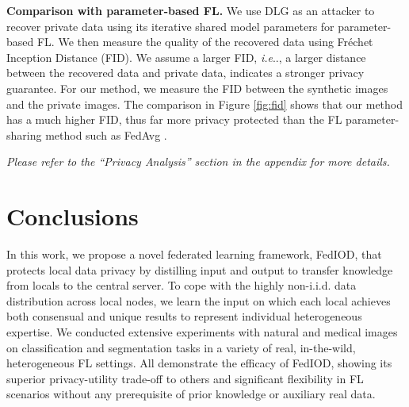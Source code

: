 \documentclass[letterpaper]{article} %
\makeatletter
\DeclareRobustCommand\onedot{\futurelet\@let@token\@onedot}
\def\@onedot{\ifx\@let@token.\else.\null\fi\xspace}
\def\ie{\emph{i.e}\onedot} \def\Ie{\emph{I.e}\onedot}
\makeatother
\begin{document}
 \textbf{Comparison with parameter-based FL.}
We use DLG \cite{zhu2019deep} as an attacker to recover private data using its iterative shared model parameters for parameter-based FL. We then measure the quality of the recovered data using Fréchet Inception Distance (FID).
We assume a larger FID, \ie, a larger distance between the recovered data and private data, indicates a stronger privacy guarantee. For our method, we measure the FID between the synthetic images and the private images. The comparison in Figure \ref{fig:fid} shows that our method has a much higher FID, thus far more privacy protected than the FL parameter-sharing method such as FedAvg \cite{mcmahan2017communication}.

\textit{Please refer to the ``Privacy Analysis'' section in the appendix for more details.}

\section{Conclusions}
In this work, we propose a novel federated learning framework, FedIOD, that protects local data privacy by distilling input and output to transfer knowledge from locals to the central server. To cope with the highly non-i.i.d. data distribution across local nodes, we learn the input on which each local achieves both consensual and unique results to represent individual heterogeneous expertise.
We conducted extensive experiments with natural and medical images on classification and segmentation tasks in a variety of real, in-the-wild, heterogeneous FL settings.
All demonstrate the efficacy of FedIOD, showing its superior privacy-utility trade-off to others and significant flexibility in FL scenarios without any prerequisite of prior knowledge or auxiliary real data.
\end{document}

